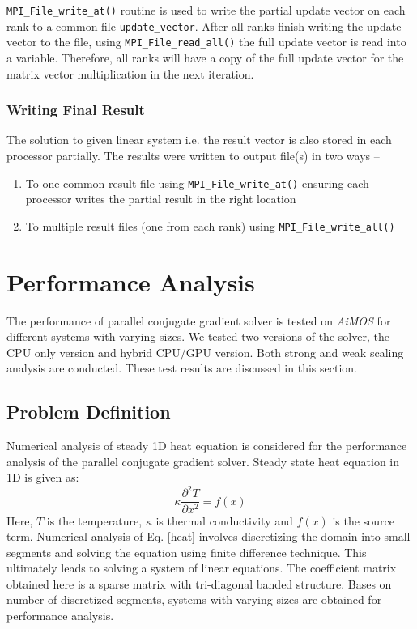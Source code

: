 \documentclass[sigplan,screen]{acmart}
\begin{document}
 \texttt{MPI\_File\_write\_at()} routine is used to write the partial update vector on each rank to a common file \texttt{update\_vector}. After all ranks finish writing the update vector to the file, using \texttt{MPI\_File\_read\_all()} the full update vector is read into a variable. Therefore, all ranks will have a copy of the full update vector for the matrix vector multiplication in the next iteration.

\subsubsection{Writing Final Result}
The solution to given linear system i.e. the result vector is also stored in each processor partially. The results were written to output file(s) in two ways -- 
\begin{enumerate}
	\item To one common result file using \texttt{MPI\_File\_write\_at()} ensuring each processor writes the partial result in the right location
	\item To multiple result files (one from each rank) using \texttt{MPI\_File\_write\_all()}
\end{enumerate}
 
 
\section{Performance Analysis}
The performance of parallel conjugate gradient solver is tested on \emph{AiMOS} for different systems with varying sizes. We tested two versions of the solver, the CPU only version and hybrid CPU/GPU version. Both strong and weak scaling analysis are conducted. These test results are discussed in this section. 
\subsection{Problem Definition}
Numerical analysis of steady 1D heat equation is considered for the performance analysis of the parallel conjugate gradient solver. Steady state heat equation in 1D is given as:
\begin{equation}\label{heat}
\kappa\frac{\partial^2 T}{\partial x^2}= f(x)
\end{equation}
Here, $T$ is the temperature, $\kappa$ is thermal conductivity and $f(x)$ is the source term. Numerical analysis of Eq. \eqref{heat} involves discretizing the domain into small segments and solving the equation using finite difference technique. This ultimately leads to solving a system of linear equations. The coefficient matrix obtained here is a sparse matrix with tri-diagonal banded structure. Bases on number of discretized segments, systems with varying sizes are obtained for performance analysis. 
\end{document}
